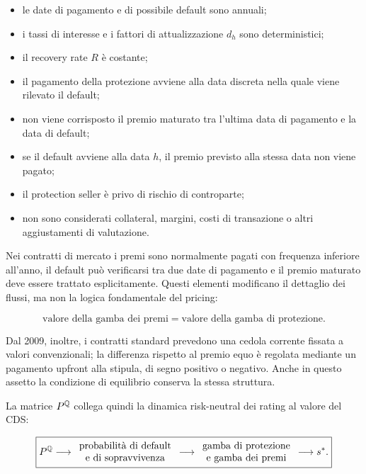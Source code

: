 \begin{itemize}

\item le date di pagamento e di possibile default sono annuali;

\item i tassi di interesse e i fattori di attualizzazione $d_h$ sono
deterministici;

\item il recovery rate $R$ \`{e} costante;

\item il pagamento della protezione avviene alla data discreta nella
quale viene rilevato il default;

\item non viene corrisposto il premio maturato tra l'ultima data di
pagamento e la data di default;

\item se il default avviene alla data $h$, il premio previsto alla
stessa data non viene pagato;

\item il protection seller \`{e} privo di rischio di controparte;

\item non sono considerati collateral, margini, costi di transazione o
altri aggiustamenti di valutazione.

\end{itemize}

Nei contratti di mercato i premi sono normalmente pagati con frequenza
inferiore all'anno, il default pu\`{o} verificarsi tra due date di
pagamento e il premio maturato deve essere trattato esplicitamente.
Questi elementi modificano il dettaglio dei flussi, ma non la logica
fondamentale del pricing:

\[
\text{valore della gamba dei premi}
=
\text{valore della gamba di protezione}.
\]

Dal 2009, inoltre, i contratti standard prevedono una cedola corrente
fissata a valori convenzionali; la differenza rispetto al premio equo
\`{e} regolata mediante un pagamento upfront alla stipula, di segno
positivo o negativo. Anche in questo assetto la condizione di
equilibrio conserva la stessa struttura.

La matrice $P^{\mathbb{Q}}$ collega quindi la dinamica risk-neutral dei rating
al valore del CDS:

\[
\boxed{
P^{\mathbb{Q}}
\longrightarrow
\begin{array}{c}
\text{probabilit\`{a} di default}
\\
\text{e di sopravvivenza}
\end{array}
\longrightarrow
\begin{array}{c}
\text{gamba di protezione}
\\
\text{e gamba dei premi}
\end{array}
\longrightarrow
s^{*}.
}
\]

